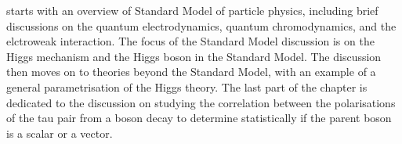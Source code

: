 








 starts with an overview of Standard Model of particle physics, including brief discussions on the quantum electrodynamics, quantum chromodynamics, and the elctroweak interaction. The focus of the Standard Model discussion is on the  Higgs mechanism and the Higgs boson in the Standard Model. The discussion then moves on to theories beyond the Standard Model, with an example of   a general parametrisation of the Higgs theory. The last part of the chapter is dedicated to the discussion on studying the correlation between the polarisations of the  tau pair from a boson decay to determine statistically if the parent boson is a  scalar or a vector.

